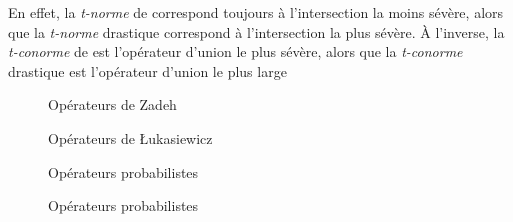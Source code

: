 En effet, la \emph{t-norme} de \textcite{Zadeh1965} correspond
toujours à l'intersection la moins sévère, alors que la \emph{t-norme}
drastique correspond à l'intersection la plus sévère. À l'inverse, la
\emph{t-conorme} de  \textcite{Zadeh1965} est l'opérateur d'union le
plus sévère, alors que la \emph{t-conorme} drastique est l'opérateur
d'union le plus large \autocite{Bouchon-Meunier2007}

\begin{figure}
  \begin{center}
    \caption{Opérateurs de Zadeh}
    \label{fig:zadeh_op}
  \end{center}
\end{figure}

\begin{figure}
  \begin{center}
    \caption{Opérateurs de Łukasiewicz}
    \label{fig:luka_op}
  \end{center}
\end{figure}

\begin{figure}
  \begin{center}
    \caption{Opérateurs probabilistes}
    \label{fig:prob_op}
  \end{center}
\end{figure}

\begin{figure}
  \begin{center}
    \caption{Opérateurs probabilistes}
    \label{fig:drast_op}
  \end{center}
\end{figure}

